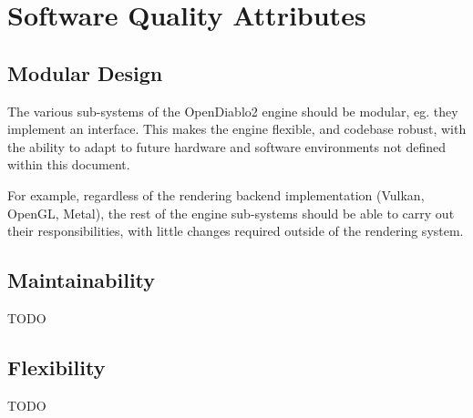 \section{Software Quality Attributes} \label{sec:softwarequalityattributes}


\subsection{Modular Design}
The various sub-systems of the OpenDiablo2 engine should be modular, eg. they
implement an interface. This makes the engine flexible, and codebase robust,
with the ability to adapt to future hardware and software environments not defined
within this document.

For example, regardless of the rendering backend implementation (Vulkan, OpenGL, 
Metal), the rest of the engine sub-systems should be able to carry out their
responsibilities, with little changes required outside of the rendering system.

\subsection{Maintainability}
TODO

\subsection{Flexibility}
TODO
